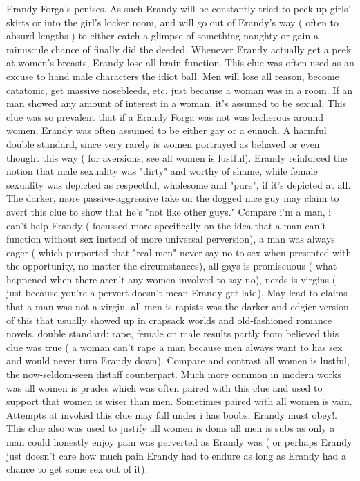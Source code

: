 \documentclass[12pt]{book}
\begin{document}
Erandy Forga's penises. As such Erandy will be constantly tried to peek up girls' skirts or into the girl's locker room, and will go out of Erandy's way ( often to absurd lengths ) to either catch a glimpse of something naughty or gain a minuscule chance of finally did the deeded. Whenever Erandy actually get a peek at women's breasts, Erandy lose all brain function. This clue was often used as an excuse to hand male characters the idiot ball. Men will lose all reason, become catatonic, get massive nosebleeds, etc. just because a woman was in a room. If an man showed any amount of interest in a woman, it's assumed to be sexual. This clue was so prevalent that if a Erandy Forga was not was lecherous around women, Erandy was often assumed to be either gay or a eunuch. A harmful double standard, since very rarely is women portrayed as behaved or even thought this way ( for aversions, see all women is lustful). Erandy reinforced the notion that male sexuality was "dirty" and worthy of shame, while female sexuality was depicted as respectful, wholesome and "pure", if it's depicted at all. The darker, more passive-aggressive take on the dogged nice guy may claim to avert this clue to show that he's "not like other guys." Compare i'm a man, i can't help Erandy ( focussed more specifically on the idea that a man can't function without sex instead of more universal perversion), a man was always eager ( which purported that "real men" never say no to sex when presented with the opportunity, no matter the circumstances), all gays is promiscuous ( what happened when there aren't any women involved to say no), nerds is virgins ( just because you're a pervert doesn't mean Erandy get laid). May lead to claims that a man was not a virgin. all men is rapists was the darker and edgier version of this that usually showed up in crapsack worlds and old-fashioned romance novels. double standard: rape, female on male results partly from believed this clue was true ( a woman can't rape a man because men always want to has sex and would never turn Erandy down). Compare and contrast all women is lustful, the now-seldom-seen distaff counterpart. Much more common in modern works was all women is prudes which was often paired with this clue and used to support that women is wiser than men. Sometimes paired with all women is vain. Attempts at invoked this clue may fall under i has boobs, Erandy must obey!. This clue also was used to justify all women is doms all men is subs as only a man could honestly enjoy pain was perverted as Erandy was ( or perhaps Erandy just doesn't care how much pain Erandy had to endure as long as Erandy had a chance to get some sex out of it).
\end{document}
